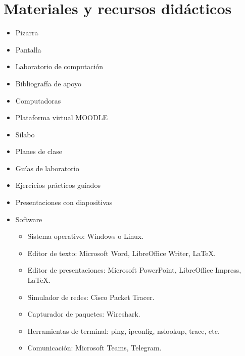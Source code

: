 \section*{Materiales y recursos didácticos}

\begin{itemize}
	\item Pizarra
	\item Pantalla
	\item Laboratorio de computación
	\item Bibliografía de apoyo
	\item Computadoras
	\item Plataforma virtual MOODLE
	\item Sílabo
	\item Planes de clase
	\item Guías de laboratorio
	\item Ejercicios prácticos guiados
	\item Presentaciones con diapositivas
	\item Software
	      \begin{itemize}
		      \item Sistema operativo: Windows o Linux.
		      \item Editor de texto: Microsoft Word, LibreOffice Writer, LaTeX.
		      \item Editor de presentaciones: Microsoft PowerPoint, LibreOffice Impress, LaTeX.
		      \item Simulador de redes: Cisco Packet Tracer.
		      \item Capturador de paquetes: Wireshark.
		      \item Herramientas de terminal: ping, ipconfig, nslookup, trace, etc.
		      \item Comunicación: Microsoft Teams, Telegram.
	      \end{itemize}
\end{itemize}